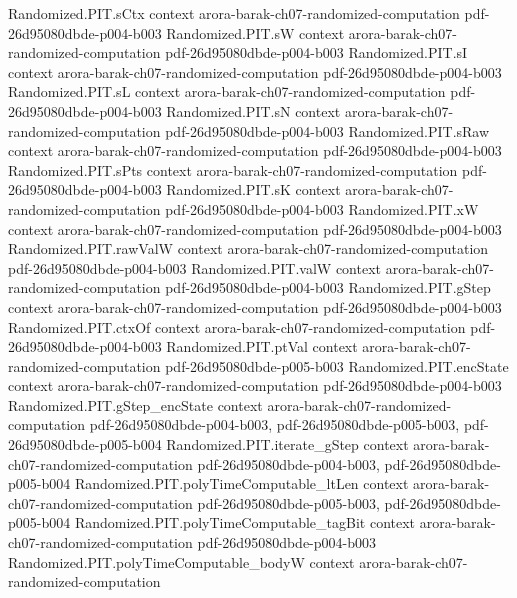 \begin{theorem}
\proofstep
  {Randomized.PIT.sCtx}
  {context}
  {arora-barak-ch07-randomized-computation}
  {pdf-26d95080dbde-p004-b003}
\proofstep
  {Randomized.PIT.sW}
  {context}
  {arora-barak-ch07-randomized-computation}
  {pdf-26d95080dbde-p004-b003}
\proofstep
  {Randomized.PIT.sI}
  {context}
  {arora-barak-ch07-randomized-computation}
  {pdf-26d95080dbde-p004-b003}
\proofstep
  {Randomized.PIT.sL}
  {context}
  {arora-barak-ch07-randomized-computation}
  {pdf-26d95080dbde-p004-b003}
\proofstep
  {Randomized.PIT.sN}
  {context}
  {arora-barak-ch07-randomized-computation}
  {pdf-26d95080dbde-p004-b003}
\proofstep
  {Randomized.PIT.sRaw}
  {context}
  {arora-barak-ch07-randomized-computation}
  {pdf-26d95080dbde-p004-b003}
\proofstep
  {Randomized.PIT.sPts}
  {context}
  {arora-barak-ch07-randomized-computation}
  {pdf-26d95080dbde-p004-b003}
\proofstep
  {Randomized.PIT.sK}
  {context}
  {arora-barak-ch07-randomized-computation}
  {pdf-26d95080dbde-p004-b003}
\proofstep
  {Randomized.PIT.xW}
  {context}
  {arora-barak-ch07-randomized-computation}
  {pdf-26d95080dbde-p004-b003}
\proofstep
  {Randomized.PIT.rawValW}
  {context}
  {arora-barak-ch07-randomized-computation}
  {pdf-26d95080dbde-p004-b003}
\proofstep
  {Randomized.PIT.valW}
  {context}
  {arora-barak-ch07-randomized-computation}
  {pdf-26d95080dbde-p004-b003}
\proofstep
  {Randomized.PIT.gStep}
  {context}
  {arora-barak-ch07-randomized-computation}
  {pdf-26d95080dbde-p004-b003}
\proofstep
  {Randomized.PIT.ctxOf}
  {context}
  {arora-barak-ch07-randomized-computation}
  {pdf-26d95080dbde-p004-b003}
\proofstep
  {Randomized.PIT.ptVal}
  {context}
  {arora-barak-ch07-randomized-computation}
  {pdf-26d95080dbde-p005-b003}
\proofstep
  {Randomized.PIT.encState}
  {context}
  {arora-barak-ch07-randomized-computation}
  {pdf-26d95080dbde-p004-b003}
\proofstep
  {Randomized.PIT.gStep_encState}
  {context}
  {arora-barak-ch07-randomized-computation}
  {pdf-26d95080dbde-p004-b003,
    pdf-26d95080dbde-p005-b003,
    pdf-26d95080dbde-p005-b004}
\proofstep
  {Randomized.PIT.iterate_gStep}
  {context}
  {arora-barak-ch07-randomized-computation}
  {pdf-26d95080dbde-p004-b003,
    pdf-26d95080dbde-p005-b004}
\proofstep
  {Randomized.PIT.polyTimeComputable_ltLen}
  {context}
  {arora-barak-ch07-randomized-computation}
  {pdf-26d95080dbde-p005-b003,
    pdf-26d95080dbde-p005-b004}
\proofstep
  {Randomized.PIT.polyTimeComputable_tagBit}
  {context}
  {arora-barak-ch07-randomized-computation}
  {pdf-26d95080dbde-p004-b003}
\proofstep
  {Randomized.PIT.polyTimeComputable_bodyW}
  {context}
  {arora-barak-ch07-randomized-computation}

\end{theorem}
